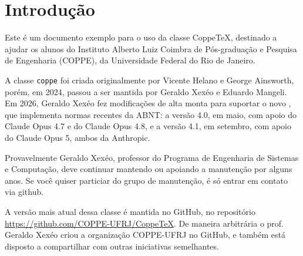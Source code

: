 \documentclass[dsc,pdfa]{coppe}
\begin{document}
  \listoffigures
  \listoftables
  \listofquadros
  \listofmapas
  \listofprogramas
  \listofalgorithms
  \printloabbreviations
  \printlosiglas
  \printlosymbols
  \tableofcontents

  \mainmatter
  \chapter{Introdução}

  Este é um documento exemplo para o uso da classe CoppeTeX, destinado a ajudar os alunos do Instituto Alberto Luiz Coimbra de Pós-graduação e Pesquisa de Engenharia (COPPE), da Universidade Federal do Rio de Janeiro.

  A classe \verb|coppe| foi criada originalmente por Vicente Helano e George Ainsworth, porém, em 2024, passou a ser mantida por Geraldo Xexéo e Eduardo Mangeli.
  Em 2026, Geraldo Xexéo fez modificações de alta monta para suportar o novo , que implementa normas recentes da ABNT: a versão 4.0, em maio, com apoio do Claude Opus 4.7 e do Claude Opus 4.8, e a versão 4.1, em setembro, com apoio do Claude Opus 5, ambos da Anthropic.

   Provavelmente Geraldo Xexéo, professor do Programa de Engenharia de Sistemas e Computação, deve continuar mantendo ou apoiando a manutenção por alguns anos. Se você quiser particiar do grupo de manutenção, é só entrar em contato via github.

  A versão mais atual dessa classe é mantida no GitHub, no repositório \url{https://github.com/COPPE-UFRJ/CoppeTeX}. De maneira arbitrária o prof. Geraldo Xexéo criou a organização COPPE-UFRJ no GitHub, e também está disposto a compartilhar com outras iniciativas semelhantes.
\end{document}

